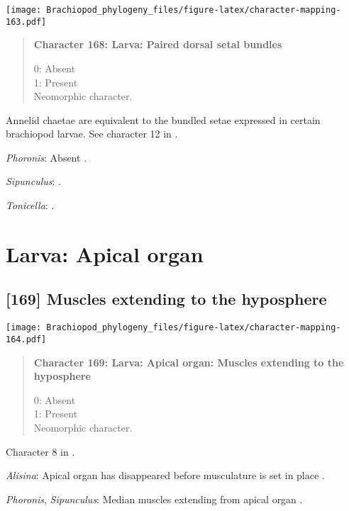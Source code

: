 \documentclass[openany]{book}
\theoremstyle{definition}
\theoremstyle{definition}
\theoremstyle{definition}
\theoremstyle{remark}
\begin{document}
\texttt{[image: Brachiopod\_phylogeny\_files/figure-latex/character-mapping-163.pdf]}

\begin{quote}
\textbf{Character 168: Larva: Paired dorsal setal bundles}

0: Absent\\
1: Present\\
Neomorphic character.
\end{quote}

Annelid chaetae are equivalent to the bundled setae expressed in certain
brachiopod larvae. See character 12 in \citet{Vinther2008}.

\hypertarget{Phoronis-coding-168}{}
\emph{Phoronis}: Absent \citep{Zimmer2013}.

\hypertarget{Sipunculus-coding-168}{}
\emph{Sipunculus}: \citep{Reed1982}.

\hypertarget{Tonicella-coding-168}{}
\emph{Tonicella}: \citet{Williams1997Introduction}.

\section{Larva: Apical organ}\label{larva-apical-organ}

\subsection*{{[}169{]} Muscles extending to the
hyposphere}\label{muscles-extending-to-the-hyposphere}

\texttt{[image: Brachiopod\_phylogeny\_files/figure-latex/character-mapping-164.pdf]}

\begin{quote}
\textbf{Character 169: Larva: Apical organ: Muscles extending to the
hyposphere}

0: Absent\\
1: Present\\
Neomorphic character.
\end{quote}

Character 8 in \citet{Vinther2008}.

\hypertarget{Alisina-coding-169}{}
\emph{Alisina}: Apical organ has disappeared before musculature is set
in place \citep{Wanninger2002M}.

\hypertarget{Phoronis-coding-169}{}
\emph{Phoronis}, \emph{Sipunculus}: Median muscles extending from apical
organ \citep{Gruhl2008}.
\end{document}

